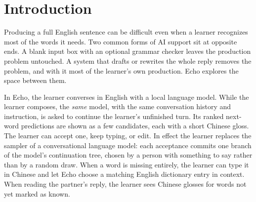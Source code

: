 \documentclass[11pt,a4paper]{article}
\begin{document}
\section{Introduction}
Producing a full English sentence can be difficult even when a learner recognizes most of the words it needs. Two common forms of AI support sit at opposite ends. A blank input box with an optional grammar checker leaves the production problem untouched. A system that drafts or rewrites the whole reply removes the problem, and with it most of the learner's own production. Echo explores the space between them.

In Echo, the learner converses in English with a local language model. While the learner composes, the \emph{same} model, with the same conversation history and instruction, is asked to continue the learner's unfinished turn. Its ranked next-word predictions are shown as a few candidates, each with a short Chinese gloss. The learner can accept one, keep typing, or edit. In effect the learner replaces the sampler of a conversational language model: each acceptance commits one branch of the model's continuation tree, chosen by a person with something to say rather than by a random draw. When a word is missing entirely, the learner can type it in Chinese and let Echo choose a matching English dictionary entry in context. When reading the partner's reply, the learner sees Chinese glosses for words not yet marked as known.
\end{document}
